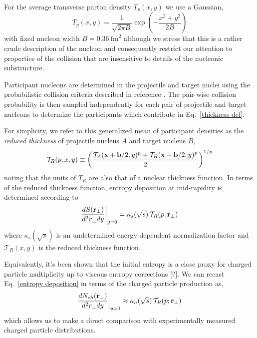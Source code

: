 \documentclass[aps,prl,reprint,amsmath,nofootinbib]{revtex4-1}
\begin{document}
For the average transverse parton density $T_p(x,y)$ we use a Gaussian,
\begin{equation}
  T_p(x,y) = \frac{1}{\sqrt{2 \pi B}} \exp\left(-\frac{x^2+y^2}{2 B}\right)
\end{equation}
with fixed nucleon width $B=0.36 ~\mathrm{fm}^2$ although we stress that this is a rather crude description of
the nucleon and consequently restrict our attention to properties of the collision that are insensitive to
details of the nucleonic substructure.

Participant nucleons are determined in the projectile and target nuclei using the probabilistic collision
criteria described in reference \cite{proton-proton}.  The pair-wise collision probability is then sampled
independently for each pair of projectile and target nucleons to determine the participants which contribute
in Eq.~\eqref{thickness def}.

For simplicity, we refer to this generalized mean of participant densities as the \emph{reduced thickness} of
projectile nucleus $A$ and target nucleus $B$,
\begin{equation}
  \label{reduced}
  \mathcal{T}_R(p;x,y) \equiv
  \left( \frac{\mathcal{T}_A({\bf x}+{\bf b}/2,y)^p + \mathcal{T}_B({\bf x}-{\bf b}/2,y)^p}{2} \right)^{1/p}
\end{equation}
noting that the units of $T_R$ are also that of a nuclear thickness function. In terms of the reduced
thickness function, entropy deposition at mid-rapidity is determined according to
\begin{equation}
  \label{entropy deposition}
  \frac{dS({\bf r}_\perp)}{d^2r_\perp dy} \biggr \rvert_{y=0} = \kappa_s(\sqrt{s})\, \mathcal{T}_R(p;{\bf r}_\perp)
\end{equation}
where $\kappa_s(\sqrt{s})$ is an undetermined energy-dependent normalization factor and $\mathcal{T}_R(x,y)$
is the reduced thickness function.

Equivalently, it's been shown that the initial entropy is a close proxy for charged particle multiplicity up
to viscous entropy corrections [?]. We can recast Eq.~\eqref{entropy deposition} in terms of the charged
particle production as,
\begin{equation}
  \label{particle production}
  \frac{dN_{ch}({\bf r}_\perp)}{d^2r_\perp dy} \biggr \rvert_{y=0} \approx
  \kappa_n(\sqrt{s})\, \mathcal{T}_R(p;{\bf r}_\perp)
\end{equation}
which allows us to make a direct comparison with experimentally measured charged particle distributions.
\end{document}
